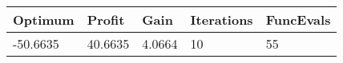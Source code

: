 \begin{tabular}{lllll}
Optimum & Profit & Gain & Iterations & FuncEvals \\ 
\hline 
-50.6635 & 40.6635 & 4.0664 & 10 & 55 \\ 
\hline 
\end{tabular}